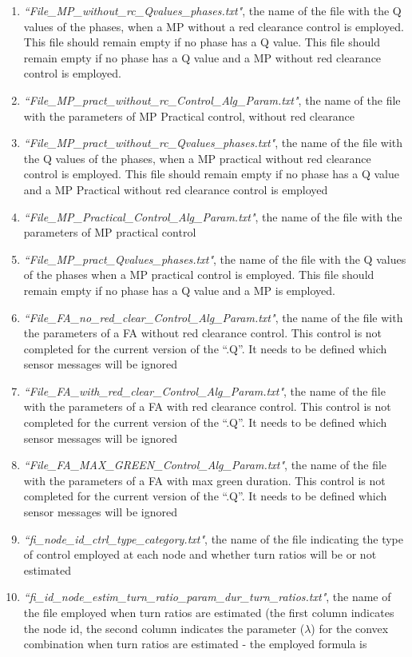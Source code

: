 \begin{enumerate}
\item \emph{``File\_MP\_without\_rc\_Qvalues\_phases.txt"}, the name of the file with the Q values  of the phases, when a MP without a red clearance control is employed. This file should remain empty  if no phase has a Q value. This file should remain empty if no phase has a Q value and a MP without red clearance control is employed.
\item \emph{``File\_MP\_pract\_without\_rc\_Control\_Alg\_Param.txt"}, the name of the file with the parameters of MP Practical control, without red clearance
\item \emph{``File\_MP\_pract\_without\_rc\_Qvalues\_phases.txt"}, the name of the file with the Q values of the phases, when a MP practical without red clearance control is employed. This file should remain empty if no phase has a Q value and a MP Practical without red clearance control is employed
\item \emph{``File\_MP\_Practical\_Control\_Alg\_Param.txt"}, the name of the  file with the parameters of MP practical control
\item \emph{``File\_MP\_pract\_Qvalues\_phases.txt"}, the name of the file with the Q values of the phases when a MP practical control is employed. This file should remain empty if no phase has a Q value and a MP is employed.
\item \emph{``File\_FA\_no\_red\_clear\_Control\_Alg\_Param.txt"}, the name of the file with the parameters of a FA without red clearance control. This control  is not completed for the current version of the ``.Q''. It needs to be defined which sensor messages will be ignored
\item \emph{``File\_FA\_with\_red\_clear\_Control\_Alg\_Param.txt"}, the name of the file with the parameters of a FA with red clearance control. This control  is not completed for the current version of the ``.Q''. It needs to be defined which sensor messages will be ignored
\item \emph{``File\_FA\_MAX\_GREEN\_Control\_Alg\_Param.txt"}, the name of the file with the parameters of a FA with max green duration. This control  is not completed for the current version of the ``.Q''. It needs to be defined which sensor messages will be ignored
\item \emph{``fi\_node\_id\_ctrl\_type\_category.txt"}, the name of the file indicating the type of control employed at each node and whether turn ratios will be or not estimated
\item \emph{``fi\_id\_node\_estim\_turn\_ratio\_param\_dur\_turn\_ratios.txt"}, the name of the file employed when turn ratios are estimated (the first column indicates the node id, the second column indicates the  parameter ($\lambda$)  for the convex combination when turn ratios are estimated - the employed formula is
 

\end{enumerate}
